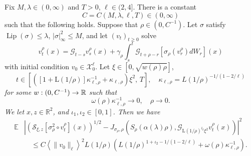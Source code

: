 \begin{proposition}
    Fix \(M,\lambda\in(0,\infty)\) and $T>0$, \(\ell\in(2,4]\). There is a constant
\[
C=C(M,\lambda,\ell,T)
\in(0,\infty)
\]
such that the following holds.
Suppose that \(\rho\in(0,C^{-1})\).
Let \(\sigma\) satisfy
\(\operatorname{Lip}(\sigma)\leq\lambda\), $|\sigma|_{\infty}^2 \leq M$, and let
\((v_t)_{t\geq 0}\) solve
\[
    v_t^{\rho}(x) = \mathcal{G}_{t-s}v_s^{\rho}(x) + \gamma_{\rho}\int_s^t\mathcal{G}_{t+\rho-r}[\sigma_{\rho}(v_r^{\rho})dW_r](x)
\]
with initial condition
\(v_0\in\mathscr{X}_0^\ell\).
Let
\(\xi\in[0,\sqrt{w(\rho)\rho}]\),
\begin{equation*}
t\in
\left[
 \left(
   [1+\mathrm{L}(1/\rho)]\kappa_{\ell,\rho}^{-1}
   +\kappa_{\ell,\rho}
 \right)\xi^2,\, T
\right],\quad \kappa_{\ell,\rho} = L(1/\rho)^{-1/(1-2/\ell)}
\end{equation*}
\textit{ for some $w:(0,C^{-1}) \to\mathbb{R}$ such that
\[\omega(\rho)\kappa_{\ell,\rho}^{-1} \to 0,\quad \rho \to 0.\]
We let \(x,z\in\mathbb{R}^2\), and \(\iota_1,\iota_2\in[0,1]\).
Then we have}
\[
\begin{aligned}
\mathbb{E}&
\left|
 \left(
   \mathcal{S}_{\xi,z}
   [\sigma_{\rho}^2\circ v^{\rho}_t](x)
 \right)^{1/2}
 -
 J_{\sigma_{\rho},\rho}
 \left(
   S_{\rho}\!\left(
     \alpha(\lambda)\rho
   \right),
   \mathcal{G}_{\mathrm{L}(1/\rho)^{l_2}\xi^2}
   v_t^{\rho}(x)
 \right)
\right|^{2} \\
&\quad\leq
C
\left\langle
 \lVert v_0\rVert_{\ell}
\right\rangle^2
 {L}(1/\rho)\left(L(1/\rho)^{1+\iota_2-1/(1-2/\ell)}+\omega(\rho)\kappa_{\ell,\rho}^{-1}\right).
\end{aligned}
\]
\end{proposition}
